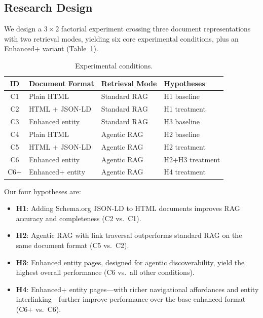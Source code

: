 \documentclass[runningheads]{llncs}
\begin{document}
\subsection{Research Design}

We design a $3 \times 2$ factorial experiment crossing three document
representations with two retrieval modes, yielding six core experimental
conditions, plus an Enhanced+ variant (Table~\ref{tab:conditions}).

\begin{table}[t]
\centering
\caption{Experimental conditions.}
\label{tab:conditions}
\begin{tabular}{@{}clll@{}}
\toprule
\textbf{ID} & \textbf{Document Format} & \textbf{Retrieval Mode} & \textbf{Hypotheses} \\
\midrule
C1 & Plain HTML       & Standard RAG & H1 baseline \\
C2 & HTML + JSON-LD   & Standard RAG & H1 treatment \\
C3 & Enhanced entity  & Standard RAG & H3 baseline \\
C4 & Plain HTML       & Agentic RAG  & H2 baseline \\
C5 & HTML + JSON-LD   & Agentic RAG  & H2 treatment \\
C6 & Enhanced entity  & Agentic RAG  & H2+H3 treatment \\
\midrule
C6+ & Enhanced+ entity & Agentic RAG  & H4 treatment \\
\bottomrule
\end{tabular}
\end{table}

Our four hypotheses are:
\begin{itemize}
    \item \textbf{H1}: Adding Schema.org JSON-LD to HTML documents
          improves RAG accuracy and completeness (C2 vs.\ C1).
    \item \textbf{H2}: Agentic RAG with link traversal outperforms
          standard RAG on the same document format (C5 vs.\ C2).
    \item \textbf{H3}: Enhanced entity pages, designed for agentic
          discoverability, yield the highest overall performance
          (C6 vs.\ all other conditions).
    \item \textbf{H4}: Enhanced+ entity pages---with richer navigational
          affordances and entity interlinking---further improve
          performance over the base enhanced format
          (C6+ vs.\ C6).
\end{itemize}
\end{document}
